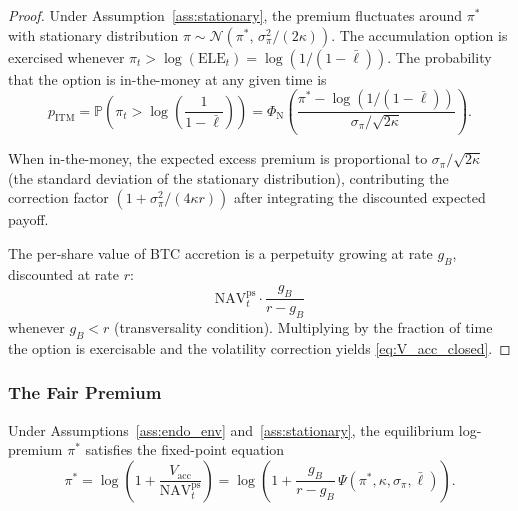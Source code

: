 \begin{proof}
Under Assumption~\ref{ass:stationary}, the premium fluctuates around $\pi^*$
with stationary distribution
$\pi \sim \mathcal{N}(\pi^*,\, \sigma_\pi^2 / (2\kappa))$.  The accumulation
option is exercised whenever $\pi_t > \log(\mathrm{ELE}_t) =
\log(1/(1-\bar\ell))$.  The probability that the option is in-the-money at
any given time is
\begin{equation}\label{eq:prob_itm}
  p_{\mathrm{ITM}} = \mathbb{P}\!\left(
    \pi_t > \log\!\left(\frac{1}{1-\bar\ell}\right)
  \right)
  = \Phi_{\mathrm{N}}\!\left(
    \frac{\pi^* - \log(1/(1-\bar\ell))}{\sigma_\pi / \sqrt{2\kappa}}
  \right).
\end{equation}

When in-the-money, the expected excess premium is proportional to
$\sigma_\pi / \sqrt{2\kappa}$ (the standard deviation of the stationary
distribution), contributing the correction factor $(1 + \sigma_\pi^2 /
(4\kappa r))$ after integrating the discounted expected payoff.

The per-share value of BTC accretion is a perpetuity growing at rate $g_B$,
discounted at rate $r$:
\[
  \mathrm{NAV}_t^{\mathrm{ps}} \cdot \frac{g_B}{r - g_B}
\]
whenever $g_B < r$ (transversality condition).  Multiplying by the fraction
of time the option is exercisable and the volatility correction yields
\eqref{eq:V_acc_closed}.
\end{proof}

\subsubsection{The Fair Premium}

\begin{theorem}\label{thm:fair_premium}
Under Assumptions~\ref{ass:endo_env} and~\ref{ass:stationary}, the
equilibrium log-premium $\pi^*$ satisfies the fixed-point equation
\begin{equation}\label{eq:pi_star_fp}
  \boxed{
    \pi^* = \log\!\left(1 + \frac{V_{\mathrm{acc}}}{\mathrm{NAV}_t^{\mathrm{ps}}}\right)
    = \log\!\left(1 + \frac{g_B}{r - g_B}\,
    \Psi(\pi^*, \kappa, \sigma_\pi, \bar\ell)\right).
  }
\end{equation}
\end{theorem}

